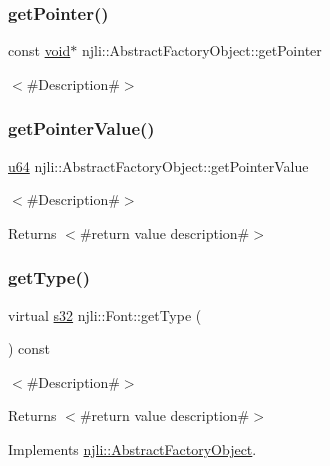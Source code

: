 \subsubsection{\texorpdfstring{get\+Pointer()}{getPointer()}}
{\footnotesize\ttfamily const \mbox{\hyperlink{_thread_8h_af1e856da2e658414cb2456cb6f7ebc66}{void}}$\ast$ njli\+::\+Abstract\+Factory\+Object\+::get\+Pointer}

$<$\#\+Description\#$>$ \mbox{\label{classnjli_1_1_font_a4ffddf141a426a5a07d0ac19f1913811}} 
\subsubsection{\texorpdfstring{get\+Pointer\+Value()}{getPointerValue()}}
{\footnotesize\ttfamily \mbox{\hyperlink{_util_8h_ad758b7a5c3f18ed79d2fcd23d9f16357}{u64}} njli\+::\+Abstract\+Factory\+Object\+::get\+Pointer\+Value}

$<$\#\+Description\#$>$

\begin{DoxyReturn}{Returns}
$<$\#return value description\#$>$ 
\end{DoxyReturn}
\mbox{\label{classnjli_1_1_font_a2c9173340456d3fbdc036b5dcc40145e}} 
\subsubsection{\texorpdfstring{get\+Type()}{getType()}}
{\footnotesize\ttfamily virtual \mbox{\hyperlink{_util_8h_aa62c75d314a0d1f37f79c4b73b2292e2}{s32}} njli\+::\+Font\+::get\+Type (\begin{DoxyParamCaption}{ }\end{DoxyParamCaption}) const\hspace{0.3cm}{\ttfamily [virtual]}}

$<$\#\+Description\#$>$

\begin{DoxyReturn}{Returns}
$<$\#return value description\#$>$ 
\end{DoxyReturn}


Implements \mbox{\hyperlink{classnjli_1_1_abstract_factory_object_a207c86146d40d0794708ae7f2d4e60a7}{njli\+::\+Abstract\+Factory\+Object}}.

